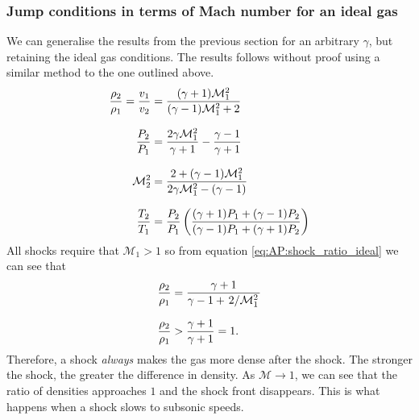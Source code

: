 \subsubsection{Jump conditions in terms of Mach number for an ideal gas}
We can generalise the results from the previous section for an arbitrary \(\gamma\), but retaining the ideal gas conditions.
 The results follows without proof using a similar method to the one outlined above.
%
\begin{align}
	\frac{\rho_2}{\rho_1} = \frac{v_1}{v_2} &= \frac{(\gamma + 1) \mathcal{M}_1^2}{(\gamma - 1) \mathcal{M}_1^2 + 2}
	\label{eq:AP:shock_ratio_ideal}
	\linedrop
	\frac{P_2}{P_1} &= \frac{2 \gamma \mathcal{M}_1^2}{\gamma + 1} - \frac{\gamma - 1}{\gamma + 1}									\nonumber
	\linedrop
	\mathcal{M}_2^2 &= \frac{2 + (\gamma - 1) \mathcal{M}_1^2}{2 \gamma \mathcal{M}_1^2 - (\gamma - 1)}							\nonumber
	\linedrop
	\frac{T_2}{T_1} &= \frac{P_2}{P_1} \left(\frac{(\gamma + 1)P_1 + (\gamma - 1)P_2}{(\gamma - 1)P_1 + (\gamma + 1)P_2}\right)		\nonumber
\end{align}
%
All shocks require that \(\mathcal{M}_1 > 1\) so from equation \ref{eq:AP:shock_ratio_ideal} we can see that
%
\begin{align}
	\frac{\rho_2}{\rho_1} &= \frac{\gamma + 1}{\gamma - 1 + \flatfrac{2}{\mathcal{M}_1^2}}	
			\nonumber
	\linedrop
	\frac{\rho_2}{\rho_1} &> \frac{\gamma + 1}{\gamma + 1} = 1.
	\label{eq:AP:shock_density_ratio_limit}
\end{align}
%
Therefore, a shock \emph{always} makes the gas more dense after the shock.
 The stronger the shock, the greater the difference in density.
 As \(\mathcal{M} \to 1\), we can see that the ratio of densities approaches \(1\) and the shock front disappears.
 This is what happens when a shock slows to subsonic speeds.
 





